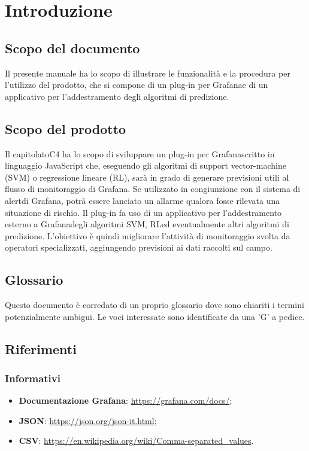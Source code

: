 \section{Introduzione}
	\subsection{Scopo del documento}
		Il presente manuale ha lo scopo di illustrare le funzionalità e la procedura per l'utilizzo del prodotto\glo, che si compone di un plug-in per Grafana\glosp e di un applicativo per l'addestramento degli algoritmi di predizione.
	\subsection{Scopo del prodotto}
		Il capitolato\glosp C4 ha lo scopo di sviluppare un plug-in per Grafana\glosp scritto in linguaggio JavaScript che, eseguendo gli algoritmi di support vector-machine (SVM\glo) o regressione lineare (RL\glo), sarà in grado di generare previsioni utili al flusso di monitoraggio di Grafana\glo. Se utilizzato in congiunzione con il sistema di alert\glosp di Grafana\glo, potrà essere lanciato un allarme qualora fosse rilevata una situazione di rischio.
		Il plug-in fa uso di un applicativo per l'addestramento esterno a Grafana\glosp degli algoritmi SVM\glo, RL\glosp ed eventualmente altri algoritmi di predizione. L'obiettivo è quindi migliorare l'attività di monitoraggio svolta da operatori specializzati, aggiungendo previsioni ai dati raccolti sul campo.
	\subsection{Glossario}
		Questo documento è corredato di un proprio glossario dove sono chiariti i termini potenzialmente ambigui. Le voci interessate sono identificate da una 'G' a pedice.
	\subsection{Riferimenti}
		\subsubsection{Informativi}
		\begin{itemize}
			\item \textbf{Documentazione Grafana}: \url{https://grafana.com/docs/};
			\item \textbf{JSON}: \url{https://json.org/json-it.html};
			\item \textbf{CSV}: \url{https://en.wikipedia.org/wiki/Comma-separated_values}.
		\end{itemize}
